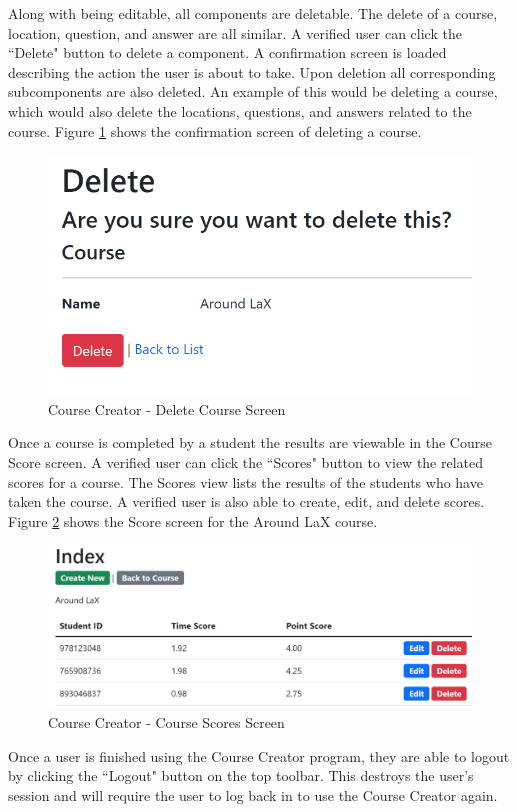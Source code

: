 Along with being editable, all components are deletable. The delete of a course, location, question, and answer are all similar. A verified user can click the ``Delete" button to delete a component. A confirmation screen is loaded describing the action the user is about to take. Upon deletion all corresponding subcomponents are also deleted. An example of this would be deleting a course, which would also delete the locations, questions, and answers related to the course. Figure \ref{CC Delete Course} shows the confirmation screen of deleting a course.
\begin{figure}[htb]
	\centering
	\includegraphics[width=.6\textwidth]{Requirements/assets/cc-delete-course.png}
	\caption[Course Creator - Delete Course Screen]{\label{CC Delete Course}Course Creator - Delete Course Screen}
\end{figure}
Once a course is completed by a student the results are viewable in the Course Score screen. A verified user can click the ``Scores" button to view the related scores for a course. The Scores view lists the results of the students who have taken the course. A verified user is also able to create, edit, and delete scores. Figure \ref{CC Scores} shows the Score screen for the Around LaX course.
\begin{figure}[htb]
	\centering
	\includegraphics[width=.6\textwidth]{Requirements/assets/cc-score-viewer.png}
	\caption[Course Creator - Course Scores Screen]{\label{CC Scores}Course Creator - Course Scores Screen}
\end{figure} 
Once a user is finished using the Course Creator program, they are able to logout by clicking the ``Logout" button on the top toolbar. This destroys the user's session and will require the user to log back in to use the Course Creator again.
